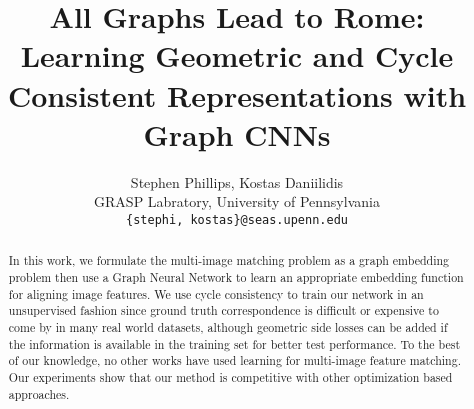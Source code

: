 \documentclass[10pt,twocolumn,letterpaper]{article}
\begin{document}
\title{All Graphs Lead to Rome: Learning Geometric and Cycle Consistent Representations with Graph CNNs}

\author{Stephen Phillips, Kostas Daniilidis \\
GRASP Labratory, University of Pennsylvania\\
{\tt\small \{stephi, kostas\}@seas.upenn.edu}
}



\maketitle


\begin{abstract}
   In this work, we formulate the multi-image matching problem as a graph embedding problem then use a Graph Neural Network to learn an appropriate embedding function for aligning image features.
   We use cycle consistency to train our network in an unsupervised fashion since ground truth correspondence is difficult or expensive to come by in many real world datasets, although geometric side losses can be added if the information is available in the training set for better test performance.
   To the best of our knowledge, no other works have used learning for multi-image feature matching.
   Our experiments show that our method is competitive with other optimization based approaches.
\end{abstract}
\end{document}
